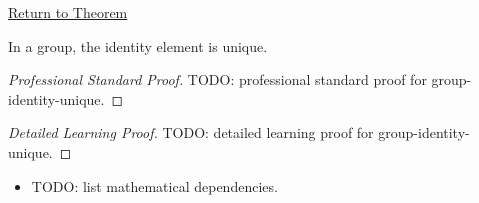 \newpage
{}
\label{prf:group-identity-unique}

\begin{remark*}[Return]
\hyperref[prop:group-identity-unique]{Return to Theorem}
\end{remark*}

\begin{theorem*}
In a group, the identity element is unique.
\end{theorem*}

\begin{proof}[Professional Standard Proof]
\LRAProofBodyStart
TODO: professional standard proof for group-identity-unique.
\end{proof}

\begin{proof}[Detailed Learning Proof]
\LRAProofBodyStart
TODO: detailed learning proof for group-identity-unique.
\end{proof}

\begin{remark*}
\end{remark*}

\begin{dependencies}
\begin{itemize}
  \item TODO: list mathematical dependencies.
\end{itemize}
\end{dependencies}

\clearpage
